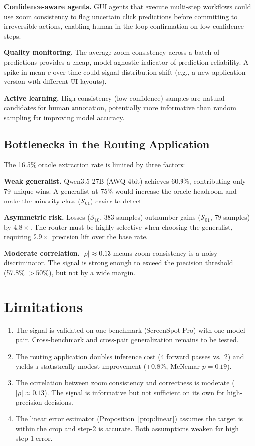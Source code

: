 \documentclass{article}
\begin{document}
\textbf{Confidence-aware agents.} GUI agents that execute multi-step workflows could use zoom consistency to flag uncertain click predictions before committing to irreversible actions, enabling human-in-the-loop confirmation on low-confidence steps.

\textbf{Quality monitoring.} The average zoom consistency across a batch of predictions provides a cheap, model-agnostic indicator of prediction reliability. A spike in mean $c$ over time could signal distribution shift (e.g., a new application version with different UI layouts).

\textbf{Active learning.} High-consistency (low-confidence) samples are natural candidates for human annotation, potentially more informative than random sampling for improving model accuracy.

\subsection{Bottlenecks in the Routing Application}

The 16.5\% oracle extraction rate is limited by three factors:

\textbf{Weak generalist.} Qwen3.5-27B (AWQ-4bit) achieves 60.9\%, contributing only 79 unique wins. A generalist at 75\% would increase the oracle headroom and make the minority class ($\mathcal{S}_{01}$) easier to detect.

\textbf{Asymmetric risk.} Losses ($\mathcal{S}_{10}$, 383 samples) outnumber gains ($\mathcal{S}_{01}$, 79 samples) by $4.8\times$. The router must be highly selective when choosing the generalist, requiring $2.9\times$ precision lift over the base rate.

\textbf{Moderate correlation.} $|\rho| \approx 0.13$ means zoom consistency is a noisy discriminator. The signal is strong enough to exceed the precision threshold (57.8\% $> 50\%$), but not by a wide margin.

\section{Limitations}

\begin{enumerate}
    \item The signal is validated on one benchmark (ScreenSpot-Pro) with one model pair. Cross-benchmark and cross-pair generalization remains to be tested.
    \item The routing application doubles inference cost (4 forward passes vs.\ 2) and yields a statistically modest improvement (+0.8\%, McNemar $p = 0.19$).
    \item The correlation between zoom consistency and correctness is moderate ($|\rho| \approx 0.13$). The signal is informative but not sufficient on its own for high-precision decisions.
    \item The linear error estimator (Proposition~\ref{prop:linear}) assumes the target is within the crop and step-2 is accurate. Both assumptions weaken for high step-1 error.
\end{enumerate}
\end{document}
